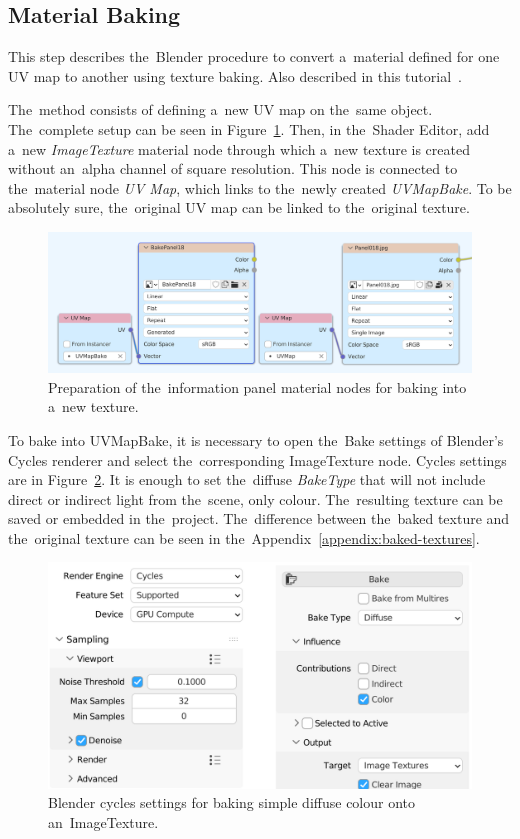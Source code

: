 \pagebreak{}
\subsection{Material Baking}
This step describes the~Blender procedure to convert a~material defined for one UV map to another using texture baking. Also described in this tutorial~\cite{blender-texture-baking-tutorial}.

The~method consists of defining a~new UV map on the~same object. The~complete setup can be seen in Figure~\ref{fig:blender-bake-nodes}. Then, in the~Shader Editor, add a~new \emph{ImageTexture} material node through which a~new texture is created without an~alpha channel of square resolution. This node is connected to the~material node \emph{UV Map}, which links to the~newly created \emph{UVMapBake}. To be absolutely sure, the~original UV map can be linked to the~original texture.

\begin{figure}[!ht]\centering
    \includegraphics[width=\textwidth]{img/blender-bake-nodes.png}
    \caption{Preparation of the~information panel material nodes for baking into a~new texture.}
    \label{fig:blender-bake-nodes}
\end{figure}

To bake into UVMapBake, it is necessary to open the~Bake settings of Blender's Cycles renderer and select the~corresponding ImageTexture node. Cycles settings are in Figure~\ref{fig:blender-bake-settings}. It is enough to set the~diffuse \emph{BakeType} that will not include direct or indirect light from the~scene, only colour. The~resulting texture can be saved or embedded in the~project. The~difference between the~baked texture and the~original texture can be seen in the~Appendix~\ref{appendix:baked-textures}.

\begin{figure}[!ht]\centering
    \includegraphics[width=\textwidth]{img/blender-bake-settings.png}
    \caption{Blender cycles settings for baking simple diffuse colour onto an~ImageTexture.}
    \label{fig:blender-bake-settings}
\end{figure}

